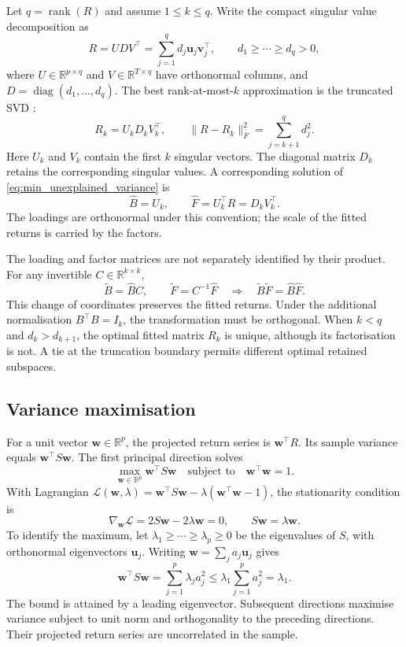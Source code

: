Let $q=\operatorname{rank}(R)$ and assume $1\leq k\leq q$. Write the compact
singular value decomposition as
\[
  R=UDV^\top=\sum_{j=1}^q d_j\mathbf{u}_j\mathbf{v}_j^\top,
  \qquad d_1\geq\cdots\geq d_q>0,
\]
where $U\in\mathbb{R}^{p\times q}$ and $V\in\mathbb{R}^{T\times q}$ have
orthonormal columns, and $D=\operatorname{diag}(d_1,\ldots,d_q)$.
The best rank-at-most-$k$ approximation is the truncated SVD
\cite{eckartYoung1936}:
\begin{equation}
  \label{eq:truncated-svd}
  R_k=U_kD_kV_k^\top,
  \qquad
  \lVert R-R_k\rVert_F^2=\sum_{j=k+1}^q d_j^2.
\end{equation}
Here $U_k$ and $V_k$ contain the first $k$ singular vectors.
The diagonal matrix $D_k$ retains the corresponding singular values.
A corresponding solution of \eqref{eq:min_unexplained_variance} is
\begin{equation}
  \label{eq:pca-factor-normalization}
  \widehat B=U_k,
  \qquad
  \widehat F=U_k^\top R=D_kV_k^\top.
\end{equation}
The loadings are orthonormal under this convention; the scale of the fitted
returns is carried by the factors.

The loading and factor matrices are not separately identified by their
product. For any invertible $C\in\mathbb{R}^{k\times k}$,
\[
  \widetilde B=\widehat B C,
  \qquad
  \widetilde F=C^{-1}\widehat F
  \quad\Longrightarrow\quad
  \widetilde B\widetilde F=\widehat B\widehat F.
\]
This change of coordinates preserves the fitted returns. Under the additional
normalisation $B^\top B=I_k$, the transformation must be orthogonal.
When $k<q$ and $d_k>d_{k+1}$, the optimal fitted
matrix $R_k$ is unique, although its factorisation is not. A tie at the
truncation boundary permits different optimal retained subspaces.

\subsection{Variance maximisation}

For a unit vector $\mathbf{w}\in\mathbb{R}^p$, the projected return series is
$\mathbf{w}^\top R$. Its sample variance equals $\mathbf{w}^\top S\mathbf{w}$.
The first principal direction solves
\begin{equation}
  \label{eq:max_portfolio_variance}
  \max_{\mathbf{w}\in\mathbb{R}^p}\mathbf{w}^\top S\mathbf{w}
  \quad\text{subject to}\quad \mathbf{w}^\top\mathbf{w}=1.
\end{equation}
With Lagrangian
$\mathcal{L}(\mathbf{w},\lambda)
=\mathbf{w}^\top S\mathbf{w}-\lambda(\mathbf{w}^\top\mathbf{w}-1)$,
the stationarity condition is
\[
  \nabla_{\mathbf{w}}\mathcal{L}
  =2S\mathbf{w}-2\lambda\mathbf{w}=0,
  \qquad S\mathbf{w}=\lambda\mathbf{w}.
\]
To identify the maximum, let $\lambda_1\geq\cdots\geq\lambda_p\geq0$
be the eigenvalues of $S$, with orthonormal eigenvectors $\mathbf{u}_j$.
Writing $\mathbf{w}=\sum_j a_j\mathbf{u}_j$ gives
\[
  \mathbf{w}^\top S\mathbf{w}
  =\sum_{j=1}^p\lambda_j a_j^2
  \leq\lambda_1\sum_{j=1}^p a_j^2=\lambda_1.
\]
The bound is attained by a leading eigenvector. Subsequent directions maximise
variance subject to unit norm and orthogonality to the preceding directions.
Their projected return series are uncorrelated in the sample.

